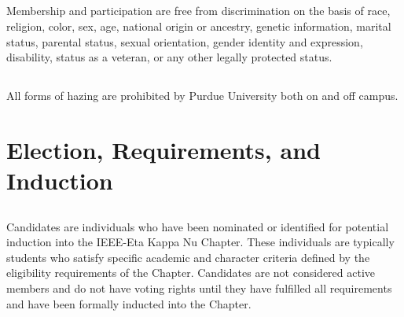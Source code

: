 \documentclass[10pt, oneside]{article}
\begin{document}
\subsection{}
Membership and participation are free from discrimination on the basis of race, religion, color, sex, age, national origin or ancestry, genetic information, marital status, parental status, sexual orientation, gender identity and expression, disability, status as a veteran, or any other legally protected status.

\subsection{}
All forms of hazing are prohibited by Purdue University both on and off campus. 




\section{Election, Requirements, and Induction}
\subsection{}
Candidates are individuals who have been nominated or identified for potential induction into the IEEE-Eta Kappa Nu Chapter. These individuals are typically students who satisfy specific academic and character criteria defined by the eligibility requirements of the Chapter. Candidates are not considered active members and do not have voting rights until they have fulfilled all requirements and have been formally inducted into the Chapter.
\end{document}
